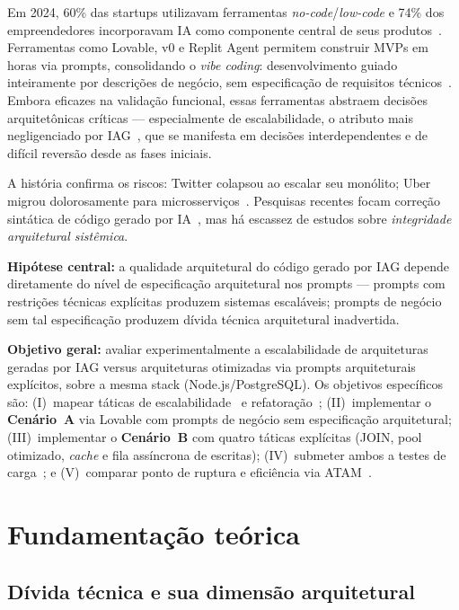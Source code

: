 \documentclass[sigconf]{acmart}
\begin{document}
Em 2024, 60\% das startups utilizavam ferramentas \textit{no-code}/\textit{low-code}
e 74\% dos empreendedores incorporavam IA como componente central de seus
produtos~\cite{RudysAI2024,HubSpot2024}. Ferramentas como Lovable, v0 e Replit Agent
permitem construir MVPs em horas via prompts, consolidando o \textit{vibe coding}: desenvolvimento
guiado inteiramente por descrições de negócio, sem especificação de requisitos
técnicos~\cite{HubSpot2024}. Embora eficazes na validação funcional, essas ferramentas
abstraem decisões arquitetônicas críticas --- especialmente de escalabilidade, o
atributo mais negligenciado por IAG~\cite{Nascimento2023,Bass2021}, que se manifesta
em decisões interdependentes e de difícil reversão desde as fases iniciais.

A história confirma os riscos: Twitter colapsou ao escalar seu monólito; Uber migrou
dolorosamente para microsserviços~\cite{Newman2021}. Pesquisas recentes focam correção
sintática de código gerado por IA~\cite{Perry2023,Liu2023,Shypula2023}, mas há
escassez de estudos sobre \textit{integridade arquitetural sistêmica}.

\textbf{Hipótese central:} a qualidade arquitetural do código gerado por IAG depende
diretamente do nível de especificação arquitetural nos prompts --- prompts com
restrições técnicas explícitas produzem sistemas escaláveis; prompts de negócio
sem tal especificação produzem dívida técnica arquitetural inadvertida.

\textbf{Objetivo geral:} avaliar experimentalmente a escalabilidade de arquiteturas
geradas por IAG versus arquiteturas otimizadas via prompts arquiteturais explícitos,
sobre a mesma stack (Node.js/PostgreSQL). Os objetivos específicos são:
(I)~mapear táticas de escalabilidade~\cite{Bass2021} e refatoração~\cite{Pressman2021};
(II)~implementar o \textbf{Cenário~A} via Lovable com prompts de negócio sem especificação
arquitetural; (III)~implementar o \textbf{Cenário~B} com quatro táticas explícitas
(JOIN, pool otimizado, \textit{cache} e fila assíncrona de escritas);
(IV)~submeter ambos a testes de carga~\cite{grafana2024}; e
(V)~comparar ponto de ruptura e eficiência via ATAM~\cite{Kazman2000}.

\section{Fundamentação teórica}

\subsection{Dívida técnica e sua dimensão arquitetural}
\end{document}
